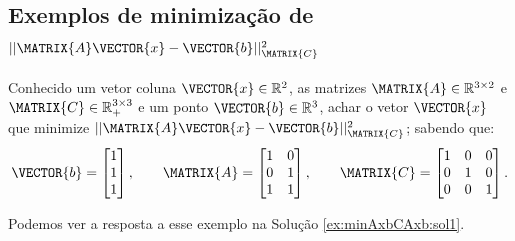 \subsection{Exemplos de minimização de $||\MATRIX{A}\VECTOR{x}-\VECTOR{b}||_{\MATRIX{C}}^2$}

\begin{example}
\label{ex:minAxbCAxb1}
Conhecido 
um vetor coluna $\VECTOR{x}\in \mathbb{R}^2$,
as matrizes $\MATRIX{A} \in \mathbb{R}^{3\times 2}$ e $\MATRIX{C} \in \mathbb{R}^{3\times 3}_{+}$
e um ponto $\VECTOR{b} \in \mathbb{R}^{3}$,
achar o vetor $\VECTOR{x}$ que minimize $||\MATRIX{A}\VECTOR{x}-\VECTOR{b}||_{\MATRIX{C}}^2$;
sabendo que:
\begin{equation}
\VECTOR{b}=\begin{bmatrix}
1\\
1\\
1
\end{bmatrix},
\qquad 
\MATRIX{A}=\begin{bmatrix}
1 & 0\\
0 & 1\\
1 & 1
\end{bmatrix},
\qquad 
\MATRIX{C}=\begin{bmatrix}
1 & 0 & 0\\
0 & 1 & 0\\
0 & 0 & 1
\end{bmatrix}.
\end{equation}

Podemos ver a resposta a esse exemplo na Solução \ref{ex:minAxbCAxb:sol1}.
\end{example}


